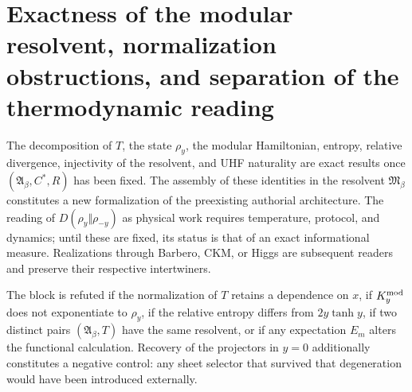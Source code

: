 \section{Exactness of the modular resolvent, normalization obstructions, and separation of the thermodynamic reading}

\begin{proofstatusbox}
The decomposition of \(T\), the state \(\rho_y\), the modular Hamiltonian,
entropy, relative divergence, injectivity of the resolvent, and
UHF naturality are exact results once
\((\mathfrak A_\beta,C^*,R)\) has been fixed. The assembly of these identities in the
resolvent \(\mathfrak M_\beta\) constitutes a new formalization of the
preexisting authorial architecture. The reading of
\(D(\rho_y\Vert\rho_{-y})\) as physical work requires temperature,
protocol, and dynamics; until these are fixed, its status is that of an exact
informational measure. Realizations through Barbero, CKM, or Higgs are
subsequent readers and preserve their respective intertwiners.
\end{proofstatusbox}

\begin{falsifierbox}
The block is refuted if the normalization of \(T\) retains a dependence on \(x\), if \(K_y^{\rm mod}\) does not exponentiate to \(\rho_y\), if the relative entropy differs from \(2y\tanh y\), if two distinct pairs \((\mathfrak A_\beta,T)\) have the same resolvent, or if any expectation \(E_m\) alters the functional calculation. Recovery of the projectors in \(y=0\) additionally constitutes a negative control: any sheet selector that survived that degeneration would have been introduced externally.
\end{falsifierbox}
